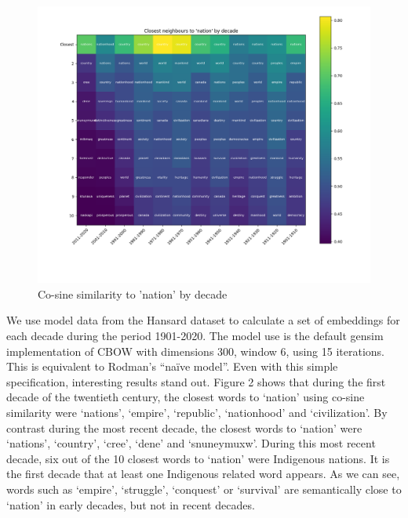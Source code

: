 \documentclass[
  openany]{book}
\begin{document}
\begin{figure}
\includegraphics[width=1\linewidth]{figures/nation} \caption{Co-sine similarity to 'nation' by decade}\label{fig:unnamed-chunk-3}
\end{figure}

We use model data from the Hansard dataset to calculate a set of embeddings for each decade during the period 1901-2020. The model use is the default gensim implementation of CBOW with dimensions 300, window 6, using 15 iterations. This is equivalent to Rodman's ``naïve model''. Even with this simple specification, interesting results stand out. Figure 2 shows that during the first decade of the twentieth century, the closest words to `nation' using co-sine similarity were `nations', `empire', `republic', `nationhood' and `civilization'. By contrast during the most recent decade, the closest words to `nation' were `nations', `country', `cree', `dene' and `snuneymuxw'. During this most recent decade, six out of the 10 closest words to `nation' were Indigenous nations. It is the first decade that at least one Indigenous related word appears. As we can see, words such as `empire', `struggle', `conquest' or `survival' are semantically close to `nation' in early decades, but not in recent decades.
\end{document}
